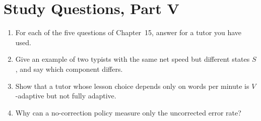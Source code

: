 \chapter*{Study Questions, Part V}
\begin{enumerate}
\item For each of the five questions of Chapter~15, answer for a tutor you have used.
\item Give an example of two typists with the same net speed but different states $S$, and say which component differs.
\item Show that a tutor whose lesson choice depends only on words per minute is $V$-adaptive but not fully adaptive.
\item Why can a no-correction policy measure only the uncorrected error rate?
\end{enumerate}
